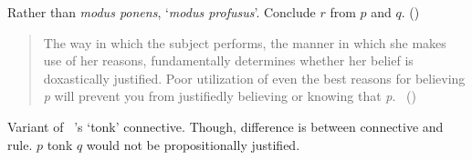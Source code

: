 \begin{note}
  Rather than \emph{modus ponens}, `\emph{modus profusus}'.
  Conclude \(r\) from \(p\) and \(q\).
  (\citeyear[317]{Turri:2010aa})

  \begin{quote}
    The way in which the subject performs, the manner in which she makes use of her reasons, fundamentally determines whether her belief is doxastically justified.
    Poor utilization of even the best reasons for believing \emph{p} will prevent you from justifiedly believing or knowing that \emph{p}.%
    \mbox{ }\hfill\mbox{(\citeyear[316]{Turri:2010aa})}
  \end{quote}

  Variant of ~\cite{Prior:1960wh}'s `tonk' connective.
  Though, difference is between connective and rule.
  \(p\) tonk \(q\) would not be propositionally justified.
\end{note}


